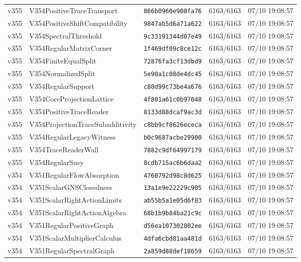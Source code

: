 \documentclass[11pt]{article}
\theoremstyle{definition}\newtheorem{deriv}{Derivação}
\begin{document}
{\begin{longtable}{@{}lllll@{}}
v355 & V354PositiveTraceTransport & \texttt{866b0960e908fa76} & 6163/6163 & 07/10 19:08:57 \\
v355 & V354PositiveShiftCompatibility & \texttt{9847ab5d6a71a622} & 6163/6163 & 07/10 19:08:57 \\
v355 & V354SpectralThreshold & \texttt{9c33191344d07e49} & 6163/6163 & 07/10 19:08:57 \\
v355 & V354RegularMatrixCorner & \texttt{1f469df09c8ce12c} & 6163/6163 & 07/10 19:08:57 \\
v355 & V354FiniteEqualSplit & \texttt{72876fa3cf13dbd9} & 6163/6163 & 07/10 19:08:57 \\
v355 & V354NormalizedSplit & \texttt{5e90a1c08de4dc45} & 6163/6163 & 07/10 19:08:57 \\
v355 & V354RegularSupport & \texttt{c80d99c73be4a676} & 6163/6163 & 07/10 19:08:57 \\
v355 & V354CoreProjectionLattice & \texttt{4f801a61c0b97048} & 6163/6163 & 07/10 19:08:57 \\
v355 & V354PositiveTraceReader & \texttt{8133d88dcaf9ac3d} & 6163/6163 & 07/10 19:08:57 \\
v355 & V354ProjectionTraceSubadditivity & \texttt{c8bb9cf8626ececa} & 6163/6163 & 07/10 19:08:57 \\
v355 & V354RegularLegacyWitness & \texttt{b0c9687acbe29900} & 6163/6163 & 07/10 19:08:57 \\
v355 & V354TraceReaderWall & \texttt{7882c9df64997179} & 6163/6163 & 07/10 19:08:57 \\
v355 & V354RegularSusy & \texttt{8cdb715ac6b6daa2} & 6163/6163 & 07/10 19:08:57 \\
v354 & V351RegularFlowAbsorption & \texttt{4760792d98c8d625} & 6163/6163 & 07/10 19:08:57 \\
v354 & V351ScalarGNSClosedness & \texttt{13a1e9e22229c905} & 6163/6163 & 07/10 19:08:57 \\
v354 & V351ScalarRightActionLimits & \texttt{ab55b5a1e05d6f83} & 6163/6163 & 07/10 19:08:57 \\
v354 & V351ScalarRightActionAlgebra & \texttt{68b1b9b84ba21c9c} & 6163/6163 & 07/10 19:08:57 \\
v354 & V351RegularPositiveGraph & \texttt{d56ea107302802ee} & 6163/6163 & 07/10 19:08:57 \\
v354 & V351ScalarMultiplierCalculus & \texttt{4dfa6cbd81aa481d} & 6163/6163 & 07/10 19:08:57 \\
v354 & V351RegularSpectralGraph & \texttt{2a859d88def18659} & 6163/6163 & 07/10 19:08:57 \\

\end{longtable}}
\end{document}
